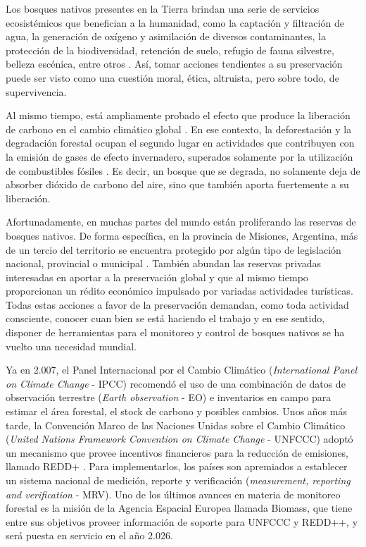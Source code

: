
Los bosques nativos presentes en la Tierra brindan una serie de servicios ecosistémicos que benefician a la humanidad, como la captación y filtración de agua, la generación de oxígeno y asimilación de diversos contaminantes, la protección de la biodiversidad, retención de suelo, refugio de fauna silvestre, belleza escénica, entre otros \cite{lin_optimization_2023}. Así, tomar acciones tendientes a su preservación puede ser visto como una cuestión moral, ética, altruista, pero sobre todo, de supervivencia.

Al mismo tiempo, está ampliamente probado el efecto que produce la liberación de carbono en el cambio climático global \cite{noauthor_pdf_nodate, kabir_climate_2023}. En ese contexto, la deforestación y la degradación forestal ocupan el segundo lugar en actividades que contribuyen con la emisión de gases de efecto invernadero, superados solamente por la utilización de combustibles fósiles \cite{chiriaco_deforestation_2024}. Es decir, un bosque que se degrada, no solamente deja de absorber dióxido de carbono del aire, sino que también aporta fuertemente a su liberación.

Afortunadamente, en muchas partes del mundo están proliferando las reservas de bosques nativos. De forma específica, en la provincia de Misiones, Argentina, más de un tercio del territorio se encuentra protegido por algún tipo de legislación nacional, provincial o municipal \cite{noauthor_revista_nodate}. También abundan las reservas privadas interesadas en aportar a la preservación global y que al mismo tiempo proporcionan un rédito económico impulsado por variadas actividades turísticas. Todas estas acciones a favor de la preservación demandan, como toda actividad consciente, conocer cuan bien se está haciendo el trabajo y en ese sentido, disponer de herramientas para el monitoreo y control de bosques nativos se ha vuelto una necesidad mundial.

Ya en 2.007, el Panel Internacional por el Cambio Climático (\textit{International Panel on Climate Change} - IPCC) recomendó el uso de una combinación de datos de observación terrestre (\textit{Earth observation} - EO) e inventarios en campo para estimar el área forestal, el stock de carbono y posibles cambios.  Unos años más tarde, la Convención Marco de las Naciones Unidas sobre el Cambio Climático (\textit{United Nations Framework Convention on Climate Change} - UNFCCC) adoptó un mecanismo que provee incentivos financieros para la reducción de emisiones, llamado REDD+ \cite{pistorius_red_2012}. Para implementarlos, los países son apremiados a establecer un sistema nacional de medición, reporte y verificación (\textit{measurement, reporting and verification} - MRV). Uno de los últimos avances en materia de monitoreo forestal es la misión de la Agencia Espacial Europea llamada Biomass, que tiene entre sus objetivos proveer información de soporte para UNFCCC y REDD++, y será puesta en servicio en el año 2.026.

